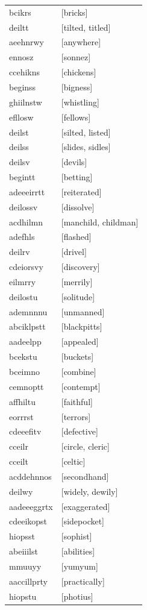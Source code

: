 \documentclass{article}
\begin{document}
\begin{tabular}{ll}
bcikrs & [bricks] \\
deiltt & [tilted, titled] \\
aeehnrwy & [anywhere] \\
ennosz & [sonnez] \\
ccehikns & [chickens] \\
beginss & [bigness] \\
ghiilnstw & [whistling] \\
efllosw & [fellows] \\
deilst & [silted, listed] \\
deilss & [slides, sidles] \\
deilsv & [devils] \\
begintt & [betting] \\
adeeeirrtt & [reiterated] \\
deilossv & [dissolve] \\
acdhilmn & [manchild, childman] \\
adefhls & [flashed] \\
deilrv & [drivel] \\
cdeiorsvy & [discovery] \\
eilmrry & [merrily] \\
deilostu & [solitude] \\
ademnnnu & [unmanned] \\
abciklpstt & [blackpitts] \\
aadeelpp & [appealed] \\
bcekstu & [buckets] \\
bceimno & [combine] \\
cemnoptt & [contempt] \\
affhiltu & [faithful] \\
eorrrst & [terrors] \\
cdeeefitv & [defective] \\
cceilr & [circle, cleric] \\
cceilt & [celtic] \\
acddehnnos & [secondhand] \\
deilwy & [widely, dewily] \\
aadeeeggrtx & [exaggerated] \\
cdeeikopst & [sidepocket] \\
hiopsst & [sophist] \\
abeiiilst & [abilities] \\
mmuuyy & [yumyum] \\
aaccillprty & [practically] \\
hiopstu & [photius] \\

\end{tabular}
\end{document}
